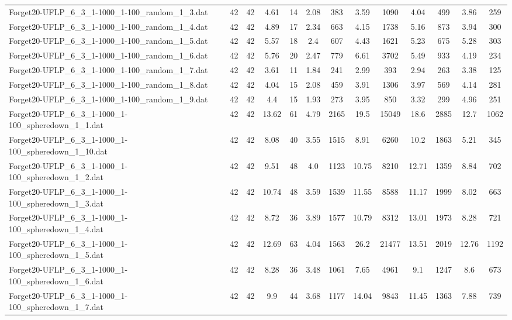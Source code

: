 \begin{table}[!ht]
{\begin{tabular}{lcccccccccccc}
Forget20-UFLP\_6\_3\_1-1000\_1-100\_random\_1\_3.dat & 42 & 42 & 4.61 & 14 & 2.08 & 383 & 3.59 & 1090 & 4.04 & 499 & 3.86 & 259 \\
Forget20-UFLP\_6\_3\_1-1000\_1-100\_random\_1\_4.dat & 42 & 42 & 4.89 & 17 & 2.34 & 663 & 4.15 & 1738 & 5.16 & 873 & 3.94 & 300 \\
Forget20-UFLP\_6\_3\_1-1000\_1-100\_random\_1\_5.dat & 42 & 42 & 5.57 & 18 & 2.4 & 607 & 4.43 & 1621 & 5.23 & 675 & 5.28 & 303 \\
Forget20-UFLP\_6\_3\_1-1000\_1-100\_random\_1\_6.dat & 42 & 42 & 5.76 & 20 & 2.47 & 779 & 6.61 & 3702 & 5.49 & 933 & 4.19 & 234 \\
Forget20-UFLP\_6\_3\_1-1000\_1-100\_random\_1\_7.dat & 42 & 42 & 3.61 & 11 & 1.84 & 241 & 2.99 & 393 & 2.94 & 263 & 3.38 & 125 \\
Forget20-UFLP\_6\_3\_1-1000\_1-100\_random\_1\_8.dat & 42 & 42 & 4.04 & 15 & 2.08 & 459 & 3.91 & 1306 & 3.97 & 569 & 4.14 & 281 \\
Forget20-UFLP\_6\_3\_1-1000\_1-100\_random\_1\_9.dat & 42 & 42 & 4.4 & 15 & 1.93 & 273 & 3.95 & 850 & 3.32 & 299 & 4.96 & 251 \\
Forget20-UFLP\_6\_3\_1-1000\_1-100\_spheredown\_1\_1.dat & 42 & 42 & 13.62 & 61 & 4.79 & 2165 & 19.5 & 15049 & 18.6 & 2885 & 12.7 & 1062 \\
Forget20-UFLP\_6\_3\_1-1000\_1-100\_spheredown\_1\_10.dat & 42 & 42 & 8.08 & 40 & 3.55 & 1515 & 8.91 & 6260 & 10.2 & 1863 & 5.21 & 345 \\
Forget20-UFLP\_6\_3\_1-1000\_1-100\_spheredown\_1\_2.dat & 42 & 42 & 9.51 & 48 & 4.0 & 1123 & 10.75 & 8210 & 12.71 & 1359 & 8.84 & 702 \\
Forget20-UFLP\_6\_3\_1-1000\_1-100\_spheredown\_1\_3.dat & 42 & 42 & 10.74 & 48 & 3.59 & 1539 & 11.55 & 8588 & 11.17 & 1999 & 8.02 & 663 \\
Forget20-UFLP\_6\_3\_1-1000\_1-100\_spheredown\_1\_4.dat & 42 & 42 & 8.72 & 36 & 3.89 & 1577 & 10.79 & 8312 & 13.01 & 1973 & 8.28 & 721 \\
Forget20-UFLP\_6\_3\_1-1000\_1-100\_spheredown\_1\_5.dat & 42 & 42 & 12.69 & 63 & 4.04 & 1563 & 26.2 & 21477 & 13.51 & 2019 & 12.76 & 1192 \\
Forget20-UFLP\_6\_3\_1-1000\_1-100\_spheredown\_1\_6.dat & 42 & 42 & 8.28 & 36 & 3.48 & 1061 & 7.65 & 4961 & 9.1 & 1247 & 8.6 & 673 \\
Forget20-UFLP\_6\_3\_1-1000\_1-100\_spheredown\_1\_7.dat & 42 & 42 & 9.9 & 44 & 3.68 & 1177 & 14.04 & 9843 & 11.45 & 1363 & 7.88 & 739 \\

\end{tabular}}
\end{table}
